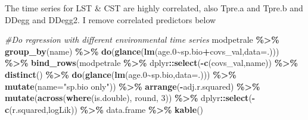 \documentclass[
]{article}
\newenvironment{Shaded}{\begin{snugshade}}{\end{snugshade}}
\newcommand{\CommentTok}[1]{\textcolor[rgb]{0.56,0.35,0.01}{\textit{#1}}}
\newcommand{\DataTypeTok}[1]{\textcolor[rgb]{0.13,0.29,0.53}{#1}}
\newcommand{\DecValTok}[1]{\textcolor[rgb]{0.00,0.00,0.81}{#1}}
\newcommand{\FloatTok}[1]{\textcolor[rgb]{0.00,0.00,0.81}{#1}}
\newcommand{\KeywordTok}[1]{\textcolor[rgb]{0.13,0.29,0.53}{\textbf{#1}}}
\newcommand{\NormalTok}[1]{#1}
\newcommand{\OperatorTok}[1]{\textcolor[rgb]{0.81,0.36,0.00}{\textbf{#1}}}
\newcommand{\StringTok}[1]{\textcolor[rgb]{0.31,0.60,0.02}{#1}}
\begin{document}
The time series for LST \& CST are highly correlated, also Tpre.a and
Tpre.b and DDegg and DDegg2. I remove correlated predictors below

\begin{Shaded}
\begin{Highlighting}[]
\CommentTok{\#Do regression with different environmental time series}
\NormalTok{modpetrale }\OperatorTok{\%>\%}\StringTok{ }
\StringTok{  }\KeywordTok{group\_by}\NormalTok{(name) }\OperatorTok{\%>\%}
\StringTok{  }\KeywordTok{do}\NormalTok{(}\KeywordTok{glance}\NormalTok{(}\KeywordTok{lm}\NormalTok{(age}\FloatTok{.0}\OperatorTok{\textasciitilde{}}\NormalTok{sp.bio}\OperatorTok{+}\NormalTok{covs\_val,}\DataTypeTok{data=}\NormalTok{.))) }\OperatorTok{\%>\%}
\StringTok{  }\KeywordTok{bind\_rows}\NormalTok{(modpetrale }\OperatorTok{\%>\%}\StringTok{ }
\StringTok{              }\NormalTok{dplyr}\OperatorTok{::}\KeywordTok{select}\NormalTok{(}\OperatorTok{{-}}\KeywordTok{c}\NormalTok{(covs\_val,name)) }\OperatorTok{\%>\%}
\StringTok{              }\KeywordTok{distinct}\NormalTok{() }\OperatorTok{\%>\%}\StringTok{ }
\StringTok{              }\KeywordTok{do}\NormalTok{(}\KeywordTok{glance}\NormalTok{(}\KeywordTok{lm}\NormalTok{(age}\FloatTok{.0}\OperatorTok{\textasciitilde{}}\NormalTok{sp.bio,}\DataTypeTok{data=}\NormalTok{.))) }\OperatorTok{\%>\%}
\StringTok{              }\KeywordTok{mutate}\NormalTok{(}\DataTypeTok{name=}\StringTok{"sp.bio only"}\NormalTok{)) }\OperatorTok{\%>\%}
\StringTok{  }\KeywordTok{arrange}\NormalTok{(}\OperatorTok{{-}}\NormalTok{adj.r.squared) }\OperatorTok{\%>\%}\StringTok{ }
\StringTok{  }\KeywordTok{mutate}\NormalTok{(}\KeywordTok{across}\NormalTok{(}\KeywordTok{where}\NormalTok{(is.double), round, }\DecValTok{3}\NormalTok{)) }\OperatorTok{\%>\%}\StringTok{ }
\StringTok{  }\NormalTok{dplyr}\OperatorTok{::}\KeywordTok{select}\NormalTok{(}\OperatorTok{{-}}\KeywordTok{c}\NormalTok{(r.squared,logLik)) }\OperatorTok{\%>\%}\StringTok{ }
\StringTok{  }\NormalTok{data.frame }\OperatorTok{\%>\%}
\StringTok{  }\KeywordTok{kable}\NormalTok{()}
\end{Highlighting}
\end{Shaded}
\end{document}
